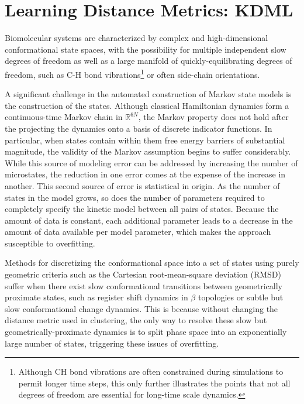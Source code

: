 \documentclass[twocolumn,floatfix,nofootinbib,aps]{revtex4-1}
\begin{document}
\section{Learning Distance Metrics: KDML}

Biomolecular systems are characterized by complex and high-dimensional conformational state spaces, with the possibility for multiple independent slow degrees of freedom as well as a large manifold of quickly-equilibrating degrees of freedom, such as C-H bond vibrations\footnote{Although CH bond vibrations are often constrained during simulations to permit longer time steps, this only further illustrates the points that not all degrees of freedom are essential for long-time scale dynamics.} or often side-chain orientations.

A significant challenge in the automated construction of Markov state models is the construction of the states. Although classical Hamiltonian dynamics form a continuous-time Markov chain in $\mathbb{R}^{6N}$\cite{vanKampen:2007ug}, the Markov property does not hold after the projecting the dynamics onto a basis of discrete indicator functions. In particular, when states contain within them free energy barriers of substantial magnitude, the validity of the Markov assumption begins to suffer considerably. While this source of modeling error can be addressed by increasing the number of microstates, the reduction in one error comes at the expense of the increase in another. This second source of error is statistical in origin. As the number of states in the model grows, so does the number of parameters required to completely specify the kinetic model between all pairs of states. Because the amount of data is constant, each additional parameter leads to a decrease in the amount of data available per model parameter, which makes the approach susceptible to overfitting.

Methods for discretizing the conformational space into a set of states using purely geometric criteria such as the Cartesian root-mean-square deviation (RMSD) suffer when there exist slow conformational transitions between geometrically proximate states, such as register shift dynamics in $\beta$ topologies\cite{Beauchamp:2012kp} or subtle but slow conformational change dynamics. This is because without changing the distance metric used in clustering, the only way to resolve these slow but geometrically-proximate dynamics is to split phase space into an exponentially large number of states, triggering these issues of overfitting.
\end{document}
